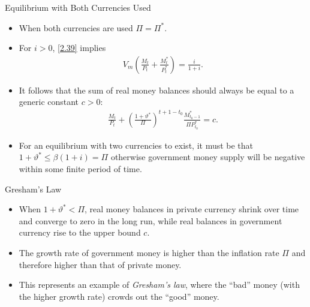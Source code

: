 \documentclass[11pt,aspectratio=169]{beamer}
\begin{document}
\begin{frame}{Equilibrium with Both Currencies Used}
\begin{itemize}
    \item When both currencies are used $\Pi = \Pi^*$.
    \item For $i>0$, \eqref{2.39} implies 
\begin{align}
V_m \left( \frac{M_t}{P_t} + \frac{M_t^*}{P_t^*} \right) = \frac{i}{1 + i}.
\end{align}
    \item It follows that the sum of real money balances should always be equal to a generic constant $c>0$:
\begin{align}
\frac{M_t}{P_t}
+ \left( \frac{1 + \vartheta^*}{\Pi} \right)^{t + 1 - t_0}
\frac{M_{t_0 - 1}^*}{\Pi P_{t_0}^*}
= c. \label{2.46}
\end{align}
    \item For an equilibrium with two currencies to exist, it must be that $
1 + \vartheta^* \leq \beta (1 + i) = \Pi
$ otherwise government money supply will be negative within some finite period of time. 
\end{itemize}
\end{frame}

\begin{frame}{Gresham's Law}
\begin{itemize}
    \item When $1 + \vartheta^* < \Pi$, real money balances in private currency shrink over time and converge to zero in the long run, while real balances in government currency rise to the upper bound $c$.
    \vspace{0.6em}
    \item The growth rate of government money is higher than the inflation rate $\Pi$ and therefore higher than that of private money.
   \vspace{0.6em}
    \item This represents an example of \textit{Gresham’s law}, where the “bad” money (with the higher growth rate) crowds out the “good” money.
\end{itemize}

\end{frame}
\end{document}
